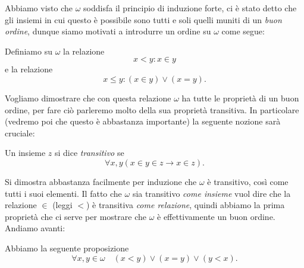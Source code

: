\documentclass[11pt]{scrartcl}
\begin{document}
 	Abbiamo visto che $\omega$ soddisfa il principio di induzione forte, ci è stato detto che gli insiemi in cui questo è possibile sono tutti e soli quelli muniti di un \textit{buon ordine}, dunque siamo motivati a introdurre un ordine su $\omega$ come segue:
 	\begin{definition}
 		Definiamo su $\omega$ la relazione
 		$$x<y:x\in y$$
 		e la relazione
 		$$x\le y:\left(x\in y\right)\lor(x=y).$$
 	\end{definition} 
 	Vogliamo dimostrare che con questa relazione $\omega$ ha tutte le proprietà di un buon ordine, per fare ciò parleremo molto della sua proprietà transitiva. In particolare (vedremo poi che questo è abbastanza importante) la seguente nozione sarà cruciale:
 	\begin{definition}
 		Un insieme $z$ si dice \textit{transitivo} se 
 		$$\forall x,y\left(x\in y \in z\to x\in z\right).$$
 	\end{definition}
 	Si dimostra abbastanza facilmente per induzione che $\omega$ è transitivo, così come tutti i suoi elementi. Il fatto che $\omega$ sia transitivo \textit{come insieme} vuol dire che la relazione $\in$ (leggi $<$) è transitiva \textit{come relazione}, quindi abbiamo la prima proprietà che ci serve per mostrare che $\omega$ è effettivamente un buon ordine. Andiamo avanti:
 	\begin{proposition}
 		Abbiamo la seguente proposizione
 		$$\forall x,y\in\omega\quad \left(x< y\right)\lor (x=y)\lor \left(y< x\right).$$
 	\end{proposition}
\end{document}

